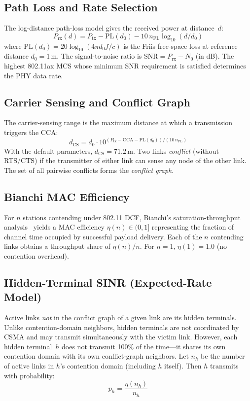 \documentclass[11pt,a4paper]{article}
\begin{document}
\subsection{Path Loss and Rate Selection}

The log-distance path-loss model gives the received power at distance~$d$:
\begin{equation}
    P_{\text{rx}}(d) = P_{\text{tx}} - \text{PL}(d_0) - 10\, n_{\text{PL}} \log_{10}(d/d_0)
\end{equation}
where $\text{PL}(d_0) = 20\log_{10}(4\pi d_0 f/c)$ is the Friis free-space loss at reference distance $d_0 = 1\,$m. The signal-to-noise ratio is $\text{SNR} = P_{\text{rx}} - N_0$ (in dB). The highest 802.11ax MCS whose minimum SNR requirement is satisfied determines the PHY data rate.

\subsection{Carrier Sensing and Conflict Graph}

The carrier-sensing range is the maximum distance at which a transmission triggers the CCA:
\begin{equation}
    d_{\text{CS}} = d_0 \cdot 10^{(P_{\text{tx}} - \text{CCA} - \text{PL}(d_0)) / (10 \, n_{\text{PL}})}
\end{equation}
With the default parameters, $d_{\text{CS}} = 71.2\,$m. Two links \emph{conflict} (without RTS/CTS) if the transmitter of either link can sense any node of the other link. The set of all pairwise conflicts forms the \emph{conflict graph}.

\subsection{Bianchi MAC Efficiency}

For $n$ stations contending under 802.11 DCF, Bianchi's saturation-throughput analysis~\cite{bianchi2000} yields a MAC efficiency $\eta(n) \in (0,1]$ representing the fraction of channel time occupied by successful payload delivery. Each of the $n$ contending links obtains a throughput share of $\eta(n)/n$. For $n=1$, $\eta(1)=1.0$ (no contention overhead).

\subsection{Hidden-Terminal SINR (Expected-Rate Model)}

Active links \emph{not} in the conflict graph of a given link are its hidden terminals. Unlike contention-domain neighbors, hidden terminals are not coordinated by CSMA and may transmit simultaneously with the victim link. However, each hidden terminal~$h$ does not transmit 100\% of the time---it shares its own contention domain with its own conflict-graph neighbors. Let $n_h$ be the number of active links in $h$'s contention domain (including $h$ itself). Then $h$ transmits with probability:
\begin{equation}
    p_h = \frac{\eta(n_h)}{n_h}
    \label{eq:txprob}
\end{equation}
\end{document}
